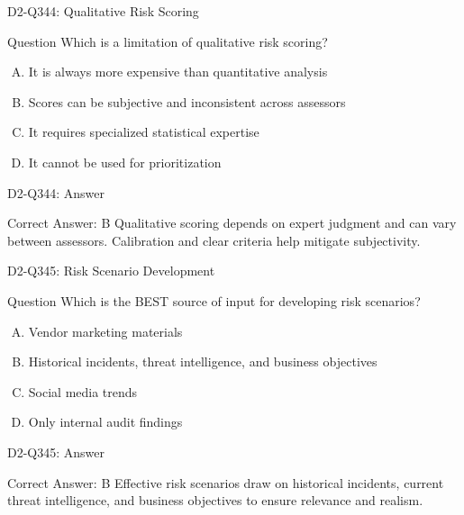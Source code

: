 \documentclass{beamer}
\begin{document}
\begin{frame}{D2-Q344: Qualitative Risk Scoring}
	\begin{block}{Question}
		Which is a limitation of qualitative risk scoring?
	\end{block}
	\begin{enumerate}[(A)]
		\item It is always more expensive than quantitative analysis
		\item Scores can be subjective and inconsistent across assessors
		\item It requires specialized statistical expertise
		\item It cannot be used for prioritization
	\end{enumerate}
\end{frame}
\begin{frame}{D2-Q344: Answer}
	\begin{block}{Correct Answer: B}
		Qualitative scoring depends on expert judgment and can vary between assessors. Calibration and clear criteria help mitigate subjectivity.
	\end{block}
\end{frame}

\begin{frame}{D2-Q345: Risk Scenario Development}
	\begin{block}{Question}
		Which is the BEST source of input for developing risk scenarios?
	\end{block}
	\begin{enumerate}[(A)]
		\item Vendor marketing materials
		\item Historical incidents, threat intelligence, and business objectives
		\item Social media trends
		\item Only internal audit findings
	\end{enumerate}
\end{frame}
\begin{frame}{D2-Q345: Answer}
	\begin{block}{Correct Answer: B}
		Effective risk scenarios draw on historical incidents, current threat intelligence, and business objectives to ensure relevance and realism.
	\end{block}
\end{frame}
\end{document}
